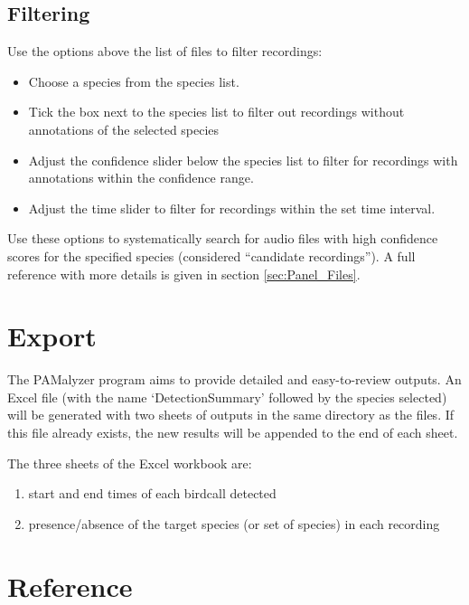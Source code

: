 \documentclass{scrartcl}
\begin{document}
\subsection{Filtering}\label{sec:FilterFileList}
Use the options above the list of files to filter recordings:
\begin{itemize}
	\item Choose a species from the species list.
	\item Tick the box next to the species list to filter out recordings without annotations of the selected species
	\item Adjust the confidence slider below the species list to filter for recordings with annotations within the confidence range.
	\item Adjust the time slider to filter for recordings within the set time interval.
\end{itemize}
Use these options to systematically search for audio files with high confidence scores for the specified species (considered ``candidate recordings'').
A full reference with more details is given in section \ref{sec:Panel_Files}.

\section{Export}\label{sec:outputs}
The PAMalyzer program aims to provide detailed and easy-to-review outputs. 
An Excel file (with the name `DetectionSummary' followed by the species selected) will be generated with two sheets of outputs in the same directory as the files.
If this file already exists, the new results will be appended to the end of each sheet. 

The three sheets of the Excel workbook are:
\begin{enumerate}
\item start and end times of each birdcall detected
\item presence/absence of the target species (or set of species) in each recording
\end{enumerate}

\section{Reference}
\end{document}
